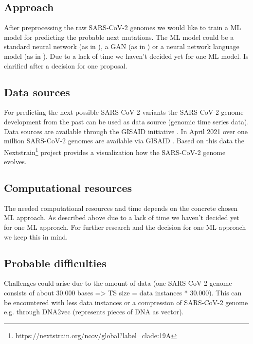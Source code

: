 \subsection{Approach}

After preprocessing the raw SARS-CoV-2 genomes we would like to train a \ac{ML} model for predicting the probable next mutations. The \ac{ML} model could be a standard neural network (as in  \cite{Salama2016}), a GAN (as in \cite{Berman2020}) or a neural network language model (as in \cite{Hie2021}). Due to a lack of time we haven't decided yet for one \ac{ML} model.
\color{green}
Is clarified after a decision for one proposal.
\color{black}

\subsection{Data sources}

For predicting the next possible SARS-CoV-2 variants the SARS-CoV-2 genome develop\-ment from the past can be used as data source (genomic time series data). Data sources are available through the GISAID initiative \cite{Gisaid2021}. In April 2021 over one million SARS-CoV-2 genomes are available via GISAID \cite{Maxmen2021}. Based on this data the Nextstrain\footnote{https://nextstrain.org/ncov/global?label=clade:19A} project provides a visualization how the SARS-CoV-2 genome evolves.


\subsection{Computational resources}

The needed computational resources and time depends on the concrete chosen \ac{ML} approach. As described above due to a lack of time we haven't decided yet for one \ac{ML} approach. For further research and the decision for one \ac{ML} approach we keep this in mind.

\subsection{Probable difficulties}

Challenges could arise due to the amount of data (one SARS-CoV-2 genome consists of about 30.000 bases => TS size = data instances * 30.000). This can be encountered with less data instances or a compression of SARS-CoV-2 genome e.g. through DNA2vec \cite{Ng2017} (represents pieces of \ac{DNA} as vector).

\newpage
